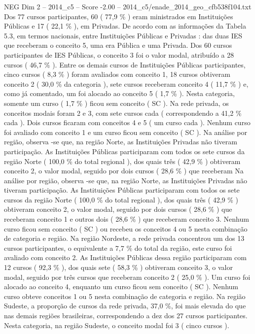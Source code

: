 \begin{textsample}{NEG Dim 2 – 2014\_c5 – Score -2.00 – 2014\_c5/enade\_2014\_geo\_cfb538f104.txt}
Dos 77 cursos participantes, 60 ( 77,9 \% ) eram ministrados em Instituições Públicas e 17 ( 22,1 \% ), em Privadas.
De acordo com as informações da Tabela 5.3, em termos nacionais, entre Instituições Públicas e Privadas : das duas IES que receberam o conceito 5, uma era Pública e uma Privada.
Dos 60 cursos participantes de IES Públicas, o conceito 3 foi o valor modal, atribuído a 28 cursos ( 46,7 \% ).
Entre os demais cursos de Instituições Públicas participantes, cinco cursos ( 8,3 \% ) foram avaliados com conceito 1, 18 cursos obtiveram conceito 2 ( 30,0 \% da categoria ), sete cursos receberam conceito 4 ( 11,7 \% ) e, como já comentado, um foi alocado ao conceito 5 ( 1,7 \% ).
Nesta categoria, somente um curso ( 1,7 \% ) ficou sem conceito ( SC ).
Na rede privada, os conceitos modais foram 2 e 3, com sete cursos cada ( correspondendo a 41,2 \% cada ).
Dois cursos ficaram com conceitos 4 e 5 ( um curso cada ).
Nenhum curso foi avaliado com conceito 1 e um curso ficou sem conceito ( SC ).
Na análise por região, observa -se que, na região Norte, as Instituições Privadas não tiveram participação.
As Instituições Públicas participaram com todos os sete cursos da região Norte ( 100,0 \% do total regional ), dos quais três ( 42,9 \% ) obtiveram conceito 2, o valor modal, seguido por dois cursos ( 28,6 \% ) que receberam Na análise por região, observa -se que, na região Norte, as Instituições Privadas não tiveram participação.
As Instituições Públicas participaram com todos os sete cursos da região Norte ( 100,0 \% do total regional ), dos quais três ( 42,9 \% ) obtiveram conceito 2, o valor modal, seguido por dois cursos ( 28,6 \% ) que receberam conceito 1 e outros dois ( 28,6 \% ) que receberam conceito 3.
Nenhum curso ficou sem conceito ( SC ) ou recebeu os conceitos 4 ou 5 nesta combinação de categoria e região.
Na região Nordeste, a rede privada concentrou um dos 13 cursos participantes, o equivalente a 7,7 \% do total da região, este curso foi avaliado com conceito 2.
As Instituições Públicas dessa região participaram com 12 cursos ( 92,3 \% ), dos quais sete ( 58,3 \% ) obtiveram conceito 3, o valor modal, seguido por três cursos que receberam conceito 2 ( 25,0 \% ).
Um curso foi alocado ao conceito 4, enquanto um curso ficou sem conceito ( SC ).
Nenhum curso obteve conceitos 1 ou 5 nesta combinação de categoria e região.
Na região Sudeste, a proporção de cursos da rede privada, 37,0 \%, foi mais elevada do que nas demais regiões brasileiras, correspondendo a dez dos 27 cursos participantes.
Nesta categoria, na região Sudeste, o conceito modal foi 3 ( cinco cursos ).

\end{textsample}
